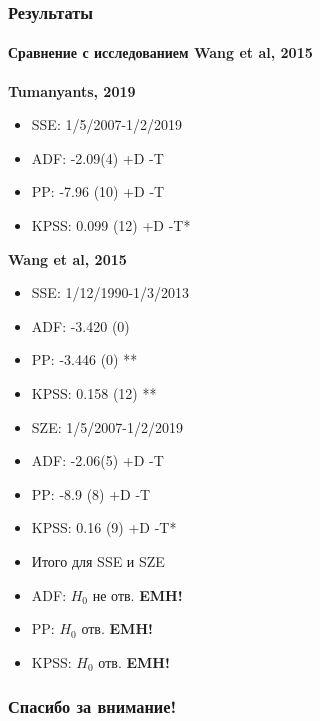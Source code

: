 \documentclass{beamer}
\begin{document}
\begin{frame}
	\frametitle{Результаты}
	\framesubtitle{Сравнение с исследованием Wang et al, 2015}
	\begin{multicols}{2}
		\begin{center}
			\textbf{Tumanyants, 2019}
		\end{center}
	\begin{itemize}
		\item SSE: 1/5/2007-1/2/2019
		\item ADF: -2.09(4) +D -T
		\item PP: -7.96 (10) +D -T
		\item KPSS: 0.099 (12) +D -T*
	\end{itemize}
	\begin{center}
		\textbf{Wang et al, 2015}
	\end{center}
\begin{itemize}
		\item SSE: 1/12/1990-1/3/2013
		\item ADF: -3.420 (0)
		\item PP: -3.446 (0) **
		\item KPSS: 0.158 (12) **
\end{itemize}
\end{multicols}

\begin{multicols}{2}
\begin{itemize}
	\item SZE: 1/5/2007-1/2/2019
	\item ADF: -2.06(5) +D -T
	\item PP: -8.9 (8) +D -T
	\item KPSS: 0.16 (9) +D -T*
\end{itemize}
\begin{itemize}
	\item Итого для SSE и SZE
	\item ADF: $H_0$ не отв. \textbf{EMH!}
	\item PP: $H_0$ отв. \textbf{EMH!}
	\item KPSS: $H_0$ отв. \textbf{EMH!}
\end{itemize}
\end{multicols}
\end{frame}

\begin{frame}[c]
\begin{center}
\frametitle{\LARGE Спасибо за внимание!}

{\LARGE \inserttitle}

\bigskip

{\insertauthor}

\bigskip\bigskip

{\insertinstitute}

\bigskip\bigskip

{\large \insertdate}
\end{center}
\end{frame}
\end{document}
